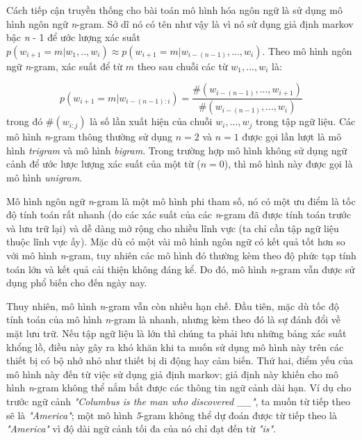 Cách tiếp cận truyền thống cho bài toán mô hình hóa ngôn ngữ là sử dụng mô hình ngôn ngữ \textit{n}-gram. Sở dĩ nó có tên như vậy là vì nó sử dụng giả định markov bậc \textit{n} - 1 để ước lượng xác suất $p \left(w_{i+1}=m|w_1,..,w_i \right) \approx p \left(w_{i+1}=m|w_{i-(n-1)},...,w_i \right)$. Theo mô hình ngôn ngữ \textit{n}-gram, xác suất để từ $m$ theo sau chuỗi các từ $w_1,...,w_{i}$ là:

\begin{equation} \label{ngramLM}
	p \left(w_{i+1}=m|w_{i-(n-1):i} \right) = \frac{\# \left(w_{i-(n-1)},...,w_{i+1} \right)}{\# \left(w_{i-(n-1)},...,w_i \right)}
\end{equation}
trong đó $\#(w_{i:j})$ là số lần xuất hiện của chuỗi $w_i,...,w_j$ trong tập ngữ liệu. Các mô hình \textit{n}-gram thông thường sử dụng $n = 2$ và $n = 1$ được gọi lần lượt là mô hình \textit{trigram} và mô hình \textit{bigram}. Trong trường hợp mô hình không sử dụng ngữ cảnh để ước lược lượng xác
suất của một từ ($n = 0$), thì mô hình này được gọi là mô hình \textit{unigram}.

Mô hình ngôn ngữ \textit{n}-gram là một mô hình phi tham số, nó có một ưu điểm là tốc độ tính toán rất nhanh (do các xác suất của các \textit{n}-gram đã được tính toán trước và lưu trữ lại) và dễ dàng mở rộng cho nhiều lĩnh vực (ta chỉ cần tập ngữ liệu thuộc lĩnh vực ấy). Mặc dù có một vài mô hình ngôn ngữ có kết quả tốt hơn so với mô hình \textit{n}-gram, tuy nhiên các mô hình đó thường kèm theo độ phức tạp tính toán lớn và kết quả cải thiện không đáng kể. Do đó, mô hình \textit{n}-gram vẫn được sử dụng phổ biến cho đến ngày nay.

Thuy nhiên, mô hình \textit{n}-gram vẫn còn nhiều hạn chế. Đầu tiên, mặc dù tốc độ tính toán của mô hình \textit{n}-gram là nhanh, nhưng kèm theo đó là sự đánh đổi về mặt lưu trữ. Nếu tập ngữ liệu là lớn thì chúng ta phải lưu những bảng xác suất khổng lồ, điều này gây ra khó khăn khi ta muốn sử dụng mô hình này trên các thiết bị có bộ nhớ nhỏ như thiết bị di động hay cảm biến. Thứ hai, điểm yếu của mô hình này đến từ việc sử dụng giả định markov; giả định này khiến cho mô hình \textit{n}-gram không thể nắm bắt được các thông tin ngữ cảnh dài hạn. Ví dụ cho trước ngữ cảnh \textit{"Columbus is the man who discovered \_\_"}, ta muốn từ tiếp theo sẽ là \textit{"America"}; một mô hình \textit{5}-gram không thể dự đoán được từ tiếp theo là \textit{"America"} vì độ dài ngữ cảnh tối đa của nó chỉ đạt đến từ \textit{"is"}.

